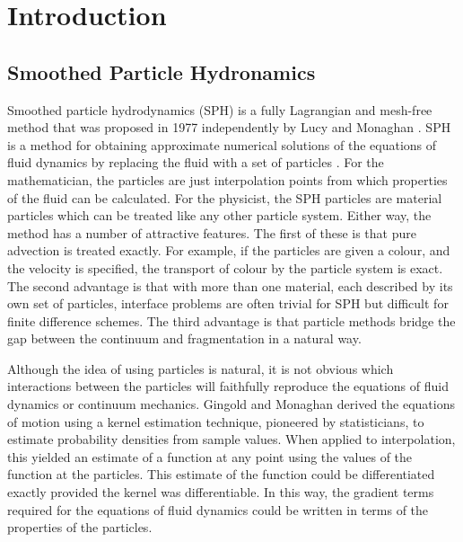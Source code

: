 
\chapter{Introduction}
\label{chap:chapter_1}

\section{Smoothed Particle Hydronamics}
\label{sec:section_1}

Smoothed particle hydrodynamics (SPH) is a fully Lagrangian and mesh-free method that was proposed in 1977 independently by Lucy \cite{lucy_numerical_1977} and 
Monaghan \cite{gingold_smoothed_1977}. SPH is a method for obtaining approximate numerical solutions of the equations of fluid dynamics by replacing the fluid with a set of 
particles \cite{monaghan_smoothed_2005}. For the mathematician, the particles are just interpolation points from which properties of the fluid
can be calculated. For the physicist, the SPH particles are material particles which can be treated like any other particle system. Either way, the method has a number of attractive 
features. The first of these is that pure advection is treated exactly. For example, if the particles are given a colour, and the velocity is specified, the transport of colour by 
the particle system is exact.  The second advantage is that with more than one material, each described by its own set of particles, interface problems 
are often trivial for SPH but difficult for finite difference schemes. The third advantage is that particle methods bridge the gap between the continuum and fragmentation in a 
natural way.\par

Although the idea of using particles is natural, it is not obvious which interactions between the particles will faithfully reproduce the equations of fluid dynamics or continuum
mechanics. Gingold and Monaghan \cite{gingold_smoothed_1977} derived the equations of motion using a kernel estimation technique, pioneered by statisticians, to estimate probability 
densities from sample values. When applied to interpolation, this yielded an estimate of a function at any point using the values of the function at the particles. This estimate of 
the function could be differentiated exactly provided the kernel was differentiable. In this way, the gradient terms required for the equations of fluid dynamics could be written in
terms of the properties of the particles.\par


